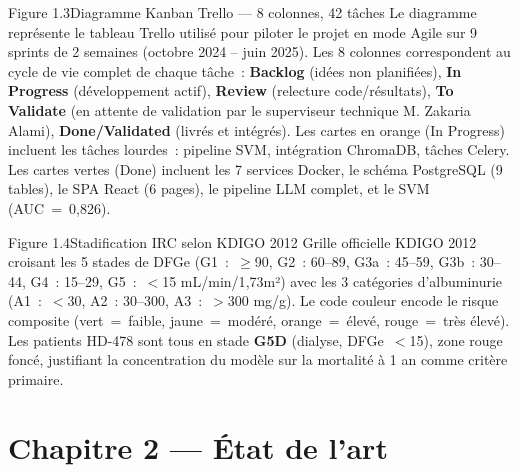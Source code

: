 \documentclass[12pt,a4paper]{article}
\begin{document}
\begin{figbox}{Figure 1.3}{Diagramme Kanban Trello --- 8 colonnes, 42 tâches}
Le diagramme représente le tableau Trello utilisé pour piloter le projet en
mode Agile sur 9 sprints de 2 semaines (octobre 2024 -- juin 2025). Les 8
colonnes correspondent au cycle de vie complet de chaque tâche~:
\textbf{Backlog} (idées non planifiées), \textbf{In Progress} (développement
actif), \textbf{Review} (relecture code/résultats), \textbf{To Validate} (en
attente de validation par le superviseur technique M. Zakaria Alami),
\textbf{Done/Validated} (livrés et intégrés). Les cartes en orange (In Progress)
incluent les tâches lourdes~: pipeline SVM, intégration ChromaDB, tâches Celery.
Les cartes vertes (Done) incluent les 7 services Docker, le schéma PostgreSQL
(9 tables), le SPA React (6 pages), le pipeline LLM complet, et le SVM
(AUC~=~0{,}826).
\end{figbox}

\begin{figbox}{Figure 1.4}{Stadification IRC selon KDIGO 2012}
Grille officielle KDIGO 2012 croisant les 5 stades de DFGe (G1~:~$\geq$90,
G2~: 60--89, G3a~: 45--59, G3b~: 30--44, G4~: 15--29, G5~:~$<$15 mL/min/1{,}73m²)
avec les 3 catégories d'albuminurie (A1~:~$<$30, A2~: 30--300, A3~:~$>$300 mg/g).
Le code couleur encode le risque composite (vert~=~faible, jaune~=~modéré,
orange~=~élevé, rouge~=~très élevé). Les patients HD-478 sont tous en stade
\textbf{G5D} (dialyse, DFGe~$<$15), zone rouge foncé, justifiant la concentration
du modèle sur la mortalité à 1 an comme critère primaire.
\end{figbox}

\section{Chapitre 2 --- État de l'art}
\end{document}
